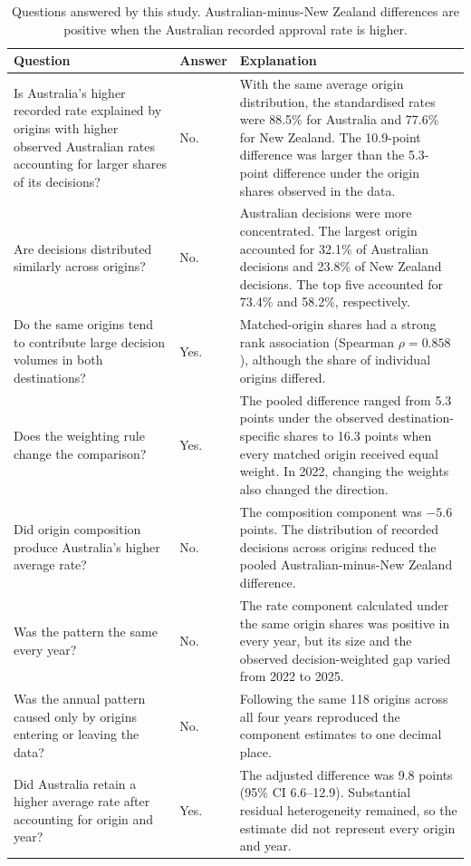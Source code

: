 \begin{table}
\caption{Questions answered by this study. Australian-minus-New Zealand differences are positive when the Australian recorded approval rate is higher.}
\label{tab:discussion-question-answers}
\centering
\small
\begin{tabular*}{\textwidth}{@{\extracolsep{\fill}}p{}p{}p{}@{}}
\toprule
Question & Answer & Explanation \\
\midrule
Is Australia's higher recorded rate explained by origins with higher observed Australian rates accounting for larger shares of its decisions? & No. & With the same average origin distribution, the standardised rates were 88.5\% for Australia and 77.6\% for New Zealand. The 10.9-point difference was larger than the 5.3-point difference under the origin shares observed in the data. \\
\midrule
Are decisions distributed similarly across origins? & No. & Australian decisions were more concentrated. The largest origin accounted for 32.1\% of Australian decisions and 23.8\% of New Zealand decisions. The top five accounted for 73.4\% and 58.2\%, respectively. \\
\midrule
Do the same origins tend to contribute large decision volumes in both destinations? & Yes. & Matched-origin shares had a strong rank association (Spearman $\rho=0.858$), although the share of individual origins differed. \\
\midrule
Does the weighting rule change the comparison? & Yes. & The pooled difference ranged from 5.3 points under the observed destination-specific shares to 16.3 points when every matched origin received equal weight. In 2022, changing the weights also changed the direction. \\
\midrule
Did origin composition produce Australia's higher average rate? & No. & The composition component was $-5.6$ points. The distribution of recorded decisions across origins reduced the pooled Australian-minus-New Zealand difference. \\
\midrule
Was the pattern the same every year? & No. & The rate component calculated under the same origin shares was positive in every year, but its size and the observed decision-weighted gap varied from 2022 to 2025. \\
\midrule
Was the annual pattern caused only by origins entering or leaving the data? & No. & Following the same 118 origins across all four years reproduced the component estimates to one decimal place. \\
\midrule
Did Australia retain a higher average rate after accounting for origin and year? & Yes. & The adjusted difference was 9.8 points (95\% CI 6.6--12.9). Substantial residual heterogeneity remained, so the estimate did not represent every origin and year. \\
\bottomrule
\end{tabular*}
\end{table}
